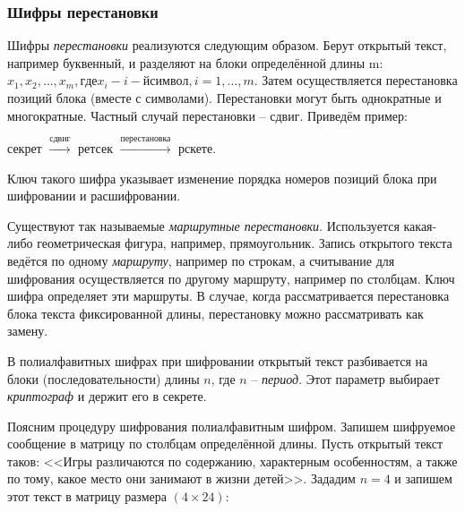 \subsubsection{Шифры перестановки}

Шифры \emph{перестановки} реализуются следующим образом. Берут открытый текст, например буквенный, и разделяют на блоки определённой длины m: $x_1, x_2, \dots, x_m, где x_i - i-й символ, i = 1, \dots , m$. Затем осуществляется перестановка позиций блока (вместе с символами). Перестановки могут быть однократные и многократные. Частный случай перестановки -- сдвиг. Приведём пример:
\begin{center}
    секрет $\xrightarrow{\text{сдвиг}}$ ретсек $\xrightarrow{\text{перестановка}}$ рскете.
\end{center}
Ключ такого шифра указывает изменение порядка номеров позиций блока при шифровании и расшифровании.

Существуют так называемые \emph{маршрутные перестановки}. Используется какая-либо геометрическая фигура, например, прямоугольник. Запись открытого текста ведётся по одному \emph{маршруту}, например по строкам, а считывание для шифрования осуществляется по другому маршруту, например по столбцам. Ключ шифра определяет эти маршруты.
В случае, когда рассматривается перестановка блока текста фиксированной длины, перестановку можно рассматривать как замену.

В полиалфавитных шифрах при шифровании открытый текст разбивается на блоки (последовательности) длины $n$, где $n$ -- \emph{период}. Этот параметр выбирает \emph{криптограф} и держит его в секрете.

Поясним процедуру шифрования полиалфавитным шифром. Запишем шифруемое сообщение в матрицу по столбцам определённой длины. Пусть открытый текст таков: <<Игры различаются по содержанию, характерным особенностям, а также по тому, какое место они занимают в жизни детей>>. Зададим $n=4$ и запишем этот текст в матрицу размера $(4 \times 24)$:

\begin{center}  \end{center}

